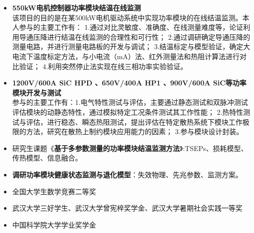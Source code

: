 \documentclass[zh]{resume}
\begin{document}
\begin{itemize}
  \item \textbf{550kW电机控制器功率模块结温在线监测}\\
        {\small 该项目的目的是在某500kW电机驱动系统中实现功率模块的在线结温监测。本人参与的主要工作有：
        1.通过对比灵敏度、准确度、在线测量难度等，论证利用导通压降进行结温在线监测的合理性和可行性；
        2.通过调研确定导通压降的测量电路，并进行测量电路板的开发与调试；
        3.结温标定与模型验证，确定大电流下温度标定方法，与小电流（mA）法、红外测量法和热阻计算法进行对比验证；
        4.利用突然停止法实现在线三相功率实验验证。}
  \item \textbf{1200V/600A SiC HPD 、650V/400A HP1 、900V/600A SiC等功率模块开发与测试}\\
  {\small 参与的主要工作有：1.电气特性测试与评估，主要通过静态测试和双脉冲测试评估模块的动静态特性，通过模拟特定工况条件测试其工作性能；
  2.热特性测试与评估，进行稳态、瞬态热阻测试，提出评估在特定散热系统下模块工作极限的方法，研究在散热上制约模块应用能力的因素；
  3.参与模块设计封装。}
  \item 研究生课题《\textbf{基于多参数测量的功率模块结温监测方法}》:TSEPs、损耗模型、传热模型、信息融合。
  \item \textbf{调研功率模块健康状态监测与退化模型}：失效物理、先兆参数、监测方案。
  
\end{itemize}

\begin{itemize}
  \item 全国大学生数学竞赛二等奖
  \item 武汉大学三好学生、武汉大学曾宪梓奖学金、武汉大学暑期社会实践一等奖
  \item 中国科学院大学学业奖学金
\end{itemize}
\end{document}
